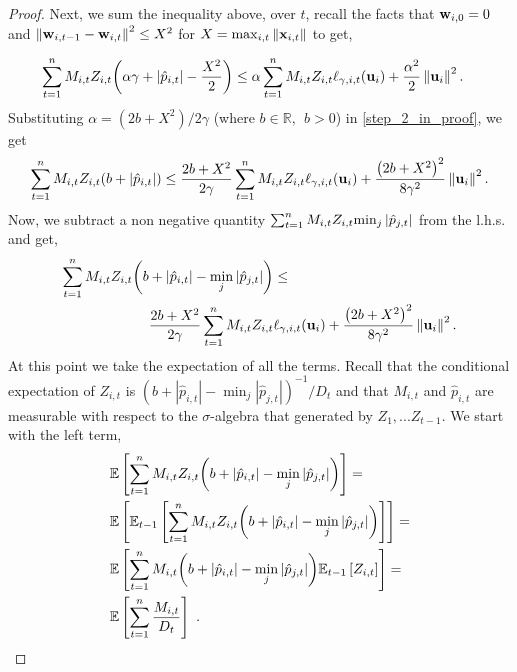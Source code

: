 {\begin{proof}
Next, we sum the inequality above, over $t$,  recall the facts that
$\mathbf{w}_{i,0}=0$ and $\left\Vert {\mathbf{w}_{i,t-1}-\mathbf{w}_{i,t}} \right\Vert^2\le X^2$ for $X=\max_{i,t}\Vert\mathbf{x}_{i,t}\Vert$ to get,

\begin{equation}
\begin{split}
\sum_{t=1}^{n}{M_{i,t}Z_{i,t}{\left({\alpha\gamma+\left\vert{\hat{p}_{i,t}}\right\vert-\frac{X^2}{2}}\right)}}
\le\alpha\sum_{t=1}^{n}{ M_{i,t}Z_{i,t}
  \ell_{\gamma,i,t}(\mathbf{u}_i)}&+\frac{\alpha^2}{2}\left\Vert {\mathbf{u}_i} \right\Vert^2.
\end{split}
\label{step_2_in_proof}
\end{equation}
Substituting $\alpha=(2b+X^2)/2\gamma$ (where $b\in\mathbb{R},~~b>0$)
in \eqref{step_2_in_proof}, we get
\begin{equation*}
\begin{split}
\sum_{t=1}^{n}{M_{i,t}Z_{i,t}{\left({b +\left\vert{\hat{p}_{i,t}}\right\vert}\right)}}
\le \frac{2b+X^2}{2\gamma}\sum_{t=1}^{n}{ M_{i,t}Z_{i,t}\ell_{\gamma,i,t}(\mathbf{u}_i)}
+\frac{\left({2b+X^2}\right)^2}{8{\gamma}^2}\left\Vert {\mathbf{u}_i} \right\Vert^2.
\end{split}
\end{equation*} 
Now, we subtract a non negative quantity $\sum_{t=1}^{n}M_{i,t}Z_{i,t}
{{\min_j{\left\vert{\hat{p}_{j,t}}\right\vert}}}$ from the l.h.s. and get,
\begin{equation}
\begin{split}
\sum_{t=1}^{n}M_{i,t}Z_{i,t}{\left({b +\left\vert{\hat{p}_{i,t}}\right\vert-\min_j{\left\vert{\hat{p}_{j,t}}\right\vert}}\right)}&\le\\
\frac{2b+X^2}{2\gamma}\sum_{t=1}^{n}{ M_{i,t}Z_{i,t}}&\ell_{\gamma,i,t}(\mathbf{u}_i)
+\frac{\left({2b+X^2}\right)^2}{8{\gamma}^2}\left\Vert {\mathbf{u}_i} \right\Vert^2.
\label{step_2_in_proof}
\end{split}
\end{equation}
At this point we take  the expectation of all the terms.  Recall that the conditional expectation of $Z_{i,t}$ is 
$(b+|\hat{p}_{i,t}|-\min_j| \hat{p}_{j,t}|)^{-1}/D_{t}$
and that $M_{i,t}$ and $\hat{p}_{i,t}$ are measurable with respect to the $\sigma$-algebra that generated by $Z_1,...Z_{t-1}$. 
We start with the left term,
\begin{align*}
\begin{split}
&\mathbb{E}\left[{\sum_{t=1}^{n}M_{i,t}Z_{i,t}{\left({{b
        +\left\vert{\hat{p}_{i,t}}\right\vert}-\min_{j}{\left\vert{ \hat{p}_{j,t}}\right\vert}}\right)}}\right]= \\
        &\mathbb{E}\left[{\mathbb{E}_{t-1}\left[{{\sum_{t=1}^{n}{M_{i,t}Z_{i,t}{\left({b +\left\vert{\hat{p}_{i,t}}\right\vert}-\min_{j}{\left\vert{\hat{p}_{j,t}}\right\vert}\right)}}}}\right]}\right]= \\
&\mathbb{E}\left[{{\sum_{t=1}^{n}M_{i,t}{\left({b +\left\vert{\hat{p}_{i,t}}\right\vert}-\min_{j}{\left\vert \hat{p}_{j,t} \right\vert}\right)}\mathbb{E}_{t-1}\left[{ Z_{i,t}}\right]}}\right]=\\
&\mathbb{E}\left[{\sum_{t=1}^{n}{\frac{M_{i,t}}{D_{t}}}}\right]~.
\end{split}
\end{align*}


\end{proof}}
